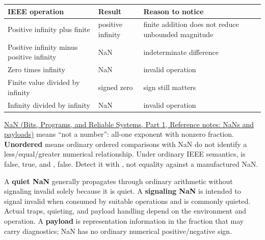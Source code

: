 {\def\LTcaptype{none} %
\begin{longtable}[]{@{}
  >{\raggedright\arraybackslash}p{}
  >{\raggedright\arraybackslash}p{}
  >{\raggedright\arraybackslash}p{}@{}}
\toprule\noalign{}
\begin{minipage}[b]{\linewidth}\raggedright
IEEE operation
\end{minipage} & \begin{minipage}[b]{\linewidth}\raggedright
Result
\end{minipage} & \begin{minipage}[b]{\linewidth}\raggedright
Reason to notice
\end{minipage} \\
\midrule\noalign{}
\endhead
\bottomrule\noalign{}
\endlastfoot
Positive infinity plus finite & positive infinity & finite addition does not reduce unbounded magnitude \\
Positive infinity minus positive infinity & NaN & indeterminate difference \\
Zero times infinity & NaN & invalid operation \\
Finite value divided by infinity & signed zero & sign still matters \\
Infinity divided by infinity & NaN & invalid operation \\
\end{longtable}
}

\href{../01-Bits-Programs-and-Reliable-Systems-P01/main.pdf\#appendix-d6607cc4c235}{NaN (Bits, Programs, and Reliable Systems, Part 1, Reference notes: NaNs and payloads)} means ``not a number'': all-one exponent with nonzero fraction. \textbf{Unordered} means ordinary ordered comparisons with NaN do not identify a less/equal/greater numerical relationship. Under ordinary IEEE semantics,  is false,  true, and ,  false. Detect it with , not equality against a manufactured NaN.

A \textbf{quiet NaN} generally propagates through ordinary arithmetic without signaling invalid solely because it is quiet. A \textbf{signaling NaN} is intended to signal invalid when consumed by suitable operations and is commonly quieted. Actual traps, quieting, and payload handling depend on the environment and operation. A \textbf{payload} is representation information in the fraction that may carry diagnostics; NaN has no ordinary numerical positive/negative sign.

